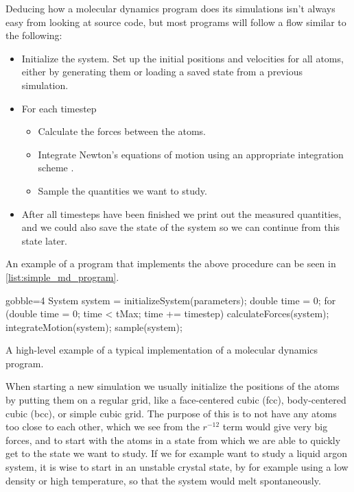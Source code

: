 Deducing how a molecular dynamics program does its simulations isn't always easy from looking at source code, but most programs will follow a flow similar to the following:
\begin{itemize}[midsep]
    \renewcommand{\labelitemii}{$\bullet$} %
    \item Initialize the system. Set up the initial positions and velocities for all atoms, either by generating them or loading a saved state from a previous simulation.
    \item For each timestep
    \begin{itemize}[midsep]
        \item Calculate the forces between the atoms.
        \item Integrate Newton's equations of motion using an appropriate integration scheme .
        \item Sample the quantities we want to study.
    \end{itemize}
    \item After all timesteps have been finished we print out the measured quantities, and we could also save the state of the system so we can continue from this state later.
\end{itemize}
An example of a program that implements the above procedure can be seen in \cref{list:simple_md_program}.
\begin{listing}
\begin{cppcode*}{gobble=4}
    System system = initializeSystem(parameters);
    double time = 0;
    for (double time = 0; time < tMax; time += timestep)
    {
        calculateForces(system);
        integrateMotion(system);
        sample(system);
    }
\end{cppcode*}
\caption{
    A high-level example of a typical implementation of a molecular dynamics program.
    \label{list:simple_md_program}
}
\end{listing}

When starting a new simulation we usually initialize the positions of the atoms by putting them on a regular grid, like a face-centered cubic (fcc), body-centered cubic (bcc), or simple cubic grid. The purpose of this is to not have any atoms too close to each other, which we see from the $r^{-12}$ term would give very big forces, and to start with the atoms in a state from which we are able to quickly get to the state we want to study. If we for example want to study a liquid argon system, it is wise to start in an unstable crystal state, by for example using a low density or high temperature, so that the system would melt spontaneously.

